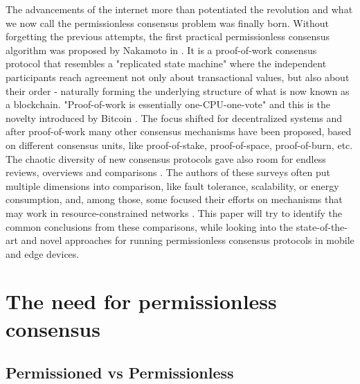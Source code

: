 \documentclass[journal]{IEEEtran}
\begin{document}
The advancements of the internet 
more than potentiated the revolution and what we now call the permissionless consensus problem was 
finally born. Without forgetting the previous attempts, the first practical permissionless consensus algorithm was 
proposed by Nakamoto in \cite{nakamoto2008bitcoin}. It is a proof-of-work consensus protocol that resembles a "replicated 
state machine" where the independent participants reach agreement not only about transactional values, 
but also about their order - naturally forming the underlying structure of what is now known as a blockchain. 
"Proof-of-work is essentially one-CPU-one-vote" and this is the novelty 
introduced by Bitcoin \cite{pass2016hybrid,pass2016hybrid2}. The focus shifted 
for decentralized systems and after proof-of-work many other consensus mechanisms have been proposed, 
based on different consensus units, like proof-of-stake, proof-of-space, proof-of-burn, etc. The chaotic 
diversity of new consensus protocols gave also room for endless reviews, overviews and comparisons \cite{survey-dist-consensus, BAMAKAN2020113385, 8400278, 8629877, 9376868, BOURAGA2021114384}. 
The authors of these surveys often put multiple dimensions into comparison, like fault tolerance, scalability, or energy consumption,
and, among those, some focused their efforts on mechanisms that may work in resource-constrained networks \cite{9104713, 8661654, 8168250, SALIMITARI2020100212}. 
This paper will try to identify the common conclusions from these comparisons, while looking into the state-of-the-art and novel approaches for running permissionless
consensus protocols in mobile and edge devices.

\section{The need for permissionless consensus}

\subsection{Permissioned vs Permissionless}
\end{document}
